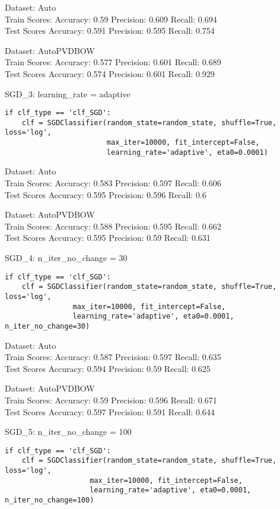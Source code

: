 \documentclass[11pt,preprint, authoryear]{elsarticle}
\numberwithin{equation}{section}
\numberwithin{figure}{section}
\numberwithin{table}{section}
\begin{document}
Dataset: Auto\\
Train Scores: Accuracy: 0.59 Precision: 0.609 Recall: 0.694\\
Test Scores Accuracy: 0.591 Precision: 0.595 Recall: 0.754

Dataset: AutoPVDBOW\\
Train Scores: Accuracy: 0.577 Precision: 0.601 Recall: 0.689\\
Test Scores Accuracy: 0.574 Precision: 0.601 Recall: 0.929

SGD\_3: learning\_rate = adaptive

\begin{verbatim}
if clf_type == 'clf_SGD':
    clf = SGDClassifier(random_state=random_state, shuffle=True, loss='log',
                        max_iter=10000, fit_intercept=False,
                        learning_rate='adaptive', eta0=0.0001)
\end{verbatim}

Dataset: Auto\\
Train Scores: Accuracy: 0.583 Precision: 0.597 Recall: 0.606\\
Test Scores Accuracy: 0.595 Precision: 0.596 Recall: 0.6

Dataset: AutoPVDBOW\\
Train Scores: Accuracy: 0.588 Precision: 0.595 Recall: 0.662\\
Test Scores Accuracy: 0.595 Precision: 0.59 Recall: 0.631

SGD\_4: n\_iter\_no\_change = 30

\begin{verbatim}
if clf_type == 'clf_SGD':
    clf = SGDClassifier(random_state=random_state, shuffle=True, loss='log',
                max_iter=10000, fit_intercept=False,
                learning_rate='adaptive', eta0=0.0001, n_iter_no_change=30)
\end{verbatim}

Dataset: Auto\\
Train Scores: Accuracy: 0.587 Precision: 0.597 Recall: 0.635\\
Test Scores Accuracy: 0.594 Precision: 0.59 Recall: 0.625

Dataset: AutoPVDBOW\\
Train Scores: Accuracy: 0.59 Precision: 0.596 Recall: 0.671\\
Test Scores Accuracy: 0.597 Precision: 0.591 Recall: 0.644

SGD\_5: n\_iter\_no\_change = 100

\begin{verbatim}
if clf_type == 'clf_SGD':
    clf = SGDClassifier(random_state=random_state, shuffle=True, loss='log',
                    max_iter=10000, fit_intercept=False,
                    learning_rate='adaptive', eta0=0.0001, n_iter_no_change=100)
\end{verbatim}
\end{document}
